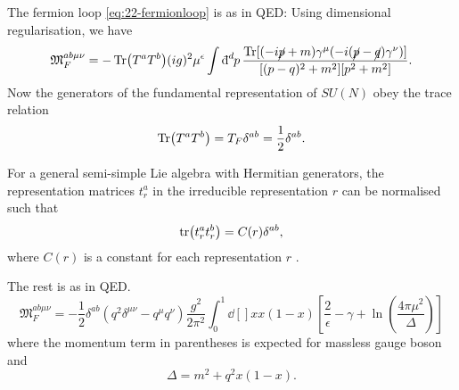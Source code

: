 The fermion loop \eqref{eq:22-fermionloop} is as in QED: Using dimensional regularisation, we have
\begin{equation}
  \mathfrak{M}_F^{ab \mu \nu} = - \Tr(T^{a} T^{b}) (ig)^2 \mu^{\epsilon} \int \bdd[d]{p} \frac{\Tr[(-i \cancel{p} + m) \gamma^{\mu} (-i (\cancel{p} - \cancel{q}) \gamma^\nu)]}{[(p - q)^2 + m^2][p^2 + m^2]}.
\end{equation}
Now the generators of the fundamental representation of $SU(N)$ obey the trace relation
\begin{equation}
  \Tr(T^{a} T^{b}) = T_F \delta^{ab} = \frac{1}{2} \delta^{ab}.
\end{equation}
\begin{leftbar}
  For a general semi-simple Lie algebra with Hermitian generators, the representation matrices $t^{a}_r$ in the irreducible representation $r$ can be normalised such that
  \begin{equation}
    \tr(t^{a}_r t^{b}_r) = C(r) \delta^{ab},
  \end{equation}
  where $C(r)$ is a constant for each representation $r$ \cite[Sec.~15.4]{peskin}.
\end{leftbar}
The rest is as in QED.
\begin{equation}
  \mathfrak{M}_{F}^{ab \mu \nu} = -\frac{1}{2} \delta^{ab} \left( q^2 \delta^{\mu\nu} - q^{\mu} q^{\nu} \right) \frac{g^2}{2 \pi^2} \int_0^1 \dd[]{x} x(1 - x) \left[ \frac{2}{\epsilon} - \gamma + \ln( \frac{4 \pi \mu^2}{\Delta}) \right]
\end{equation}
where the momentum term in parentheses is expected for massless gauge boson and
\begin{equation}
  \Delta = m^2 + q^2 x(1 - x).
\end{equation}
